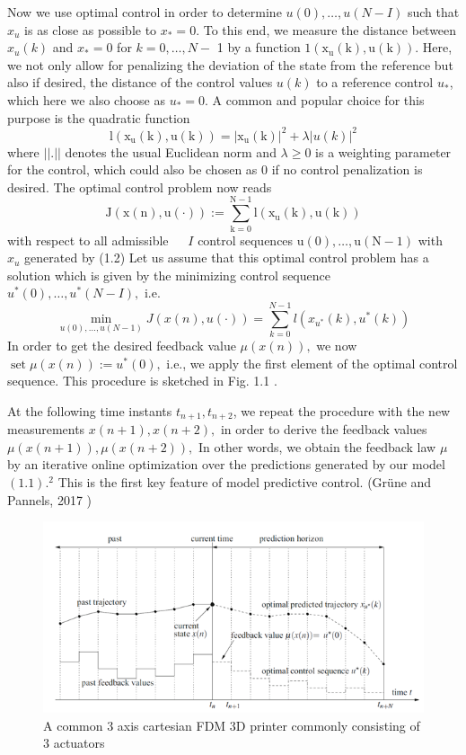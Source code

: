 \documentclass{UoNMCHA}
\numberwithin{equation}{section}
\begin{document}
	Now we use optimal control in order to determine $u(0), \ldots, u(N-I)$ such that $x_{u}$ is as close as
	possible to $x_{*}=0 .$ To this end, we measure the distance between $x_{u}(k)$ and $x_{*}=0$ for $k=0, \ldots, N-$ 1 by a function $1\left(\mathrm{x}_{\mathrm{u}}(\mathrm{k}), \mathrm{u}(\mathrm{k})\right)$. Here, we not only allow for penalizing the deviation of the state from
	the reference but also if desired, the distance of the control values $u(k)$ to a reference control $u_{*}$, which
	here we also choose as $u_{*}=0 .$ A common and popular choice for this purpose is the quadratic function
	$$
	\mathrm{l}\left(\mathrm{x}_{\mathrm{u}}(\mathrm{k}), \mathrm{u}(\mathrm{k})\right)=\left|\mathrm{x}_{\mathrm{u}}(\mathrm{k})\right|^{2}+\lambda|u(k)|^{2}
	$$
	where $|| . ||$ denotes the usual Euclidean norm and $\lambda \geq 0$ is a weighting parameter for the control, which
	could also be chosen as 0 if no control penalization is desired.
	The optimal control problem now reads
	$$
	\mathrm{J}(\mathrm{x}(\mathrm{n}), \mathrm{u}(\cdot)):=\sum_{\mathrm{k}=0}^{\mathrm{N}-1} \mathrm{l}\left(\mathrm{x}_{\mathrm{u}}(\mathrm{k}), \mathrm{u}(\mathrm{k})\right)
	$$
	with respect to all admissible $\ \quad I$ control sequences $\mathrm{u}(0), \ldots, \mathrm{u}(\mathrm{N}-1)$ with $x_{u}$ generated by (1.2)
	Let us assume that this optimal control problem has a solution which is given by the minimizing control
	sequence $u^{*}(0), \ldots, u^{*}(N-I),$ i.e.
	$$
	\min _{u(0), \ldots, u(N-1)} J(x(n), u(\cdot))=\sum_{k=0}^{N-1} l\left(x_{u^{*}}(k), u^{*}(k)\right)
	$$
	In order to get the desired feedback value $\mu(x(n)),$ we now $\operatorname{set} \mu(x(n)):=u^{*}(0),$
	i.e., we apply the first element of the optimal control sequence. This procedure is sketched in Fig. 1.1 .
	
	
	At the following time instants $t_{n+1}, t_{n+2}$, we repeat the procedure with the new measurements
	$x(n+1), x(n+2),$ in order to derive the feedback values $\mu(x(n+1)), \mu(x(n+2)),$ In other words,
	we obtain the feedback law $\mu$ by an iterative online optimization over the predictions generated by our
	model $(1.1) .^{2}$ This is the first key feature of model predictive control. (Grüne and Pannels, 2017 )
	
	\begin{figure}[H]
		\begin{center}
			\includegraphics[width=.8\linewidth]{figs/Picture7}
			\caption{A  common 3 axis cartesian FDM 3D printer commonly consisting of 3 actuators}
			\label{figs/Picture7}
		\end{center}
	\end{figure}
	
\end{document}
